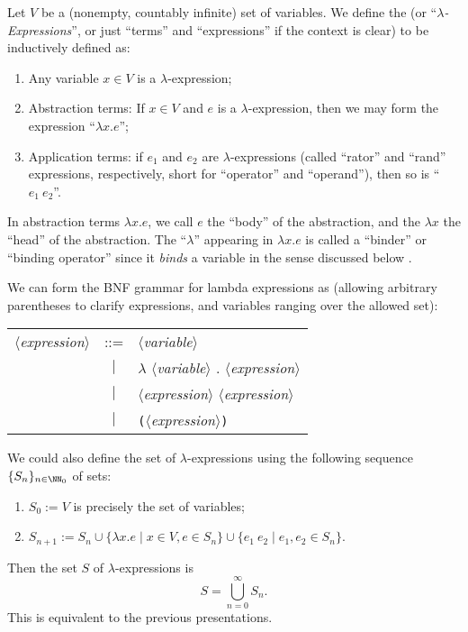 \begin{node}[Syntax]\label{untyped-lambda-0002}%

\begin{definition}\label{untyped-lambda-0000}%
Let $V$ be a (nonempty, countably infinite) set of variables. We define
the  (or ``\textit{$\lambda$-Expressions}'', or
just ``terms'' and ``expressions'' if the context is clear) to be
inductively defined as:
\begin{enumerate}
\item Any variable $x\in V$ is a $\lambda$-expression;
\item Abstraction terms: If $x\in V$ and $e$ is a $\lambda$-expression,
  then we may form the expression ``$\lambda x.e$'';
\item Application terms: if $e_{1}$ and $e_{2}$ are
  $\lambda$-expressions (called ``rator'' and ``rand'' expressions,
  respectively, short for ``operator'' and ``operand''),
  then so is ``$e_{1}~e_{2}$''.
\end{enumerate}
In abstraction terms $\lambda x.e$, we call $e$ the ``body'' of the
abstraction, and the $\lambda x$ the ``head'' of the abstraction. The
``$\lambda$'' appearing in $\lambda x.e$ is called a ``binder'' or
``binding operator'' since it \emph{binds} a variable in the sense
discussed below .

\begin{node}\label{untyped-lambda-0001}%
We can form the BNF grammar for lambda expressions as (allowing
arbitrary parentheses to clarify expressions, and variables ranging over
the allowed set):
\begin{center}  
\begin{tabular}{rcl}
$\langle$\textit{expression}$\rangle$ & ::= & $\langle$\textit{variable}$\rangle$\\
& $|$ & $\lambda$ $\langle$\textit{variable}$\rangle$ $.$ $\langle$\textit{expression}$\rangle$\\
& $|$ & $\langle$\textit{expression}$\rangle$ $\langle$\textit{expression}$\rangle$\\
& $|$ & \texttt{(}$\langle$\textit{expression}$\rangle$\texttt{)}
\end{tabular}
\end{center}
\end{node}

\begin{node}\label{untyped-lambda-0004}%
We could also define the set of $\lambda$-expressions using the
following sequence $\{S_{n}\}_{n\in\NN_{0}}$ of sets:
\begin{enumerate}
\item $S_{0}:=V$ is precisely the set of variables;
\item $S_{n+1}:=S_{n}\cup\{\lambda x.e\mid x\in V,e\in S_{n}\}\cup\{e_{1}~e_{2}\mid e_{1},e_{2}\in S_{n}\}$.
\end{enumerate}
Then the set $S$ of $\lambda$-expressions is
\begin{equation}
S = \bigcup^{\infty}_{n=0}S_{n}.
\end{equation}
This is equivalent to the previous presentations.
\end{node}
\end{definition}


\end{node}
